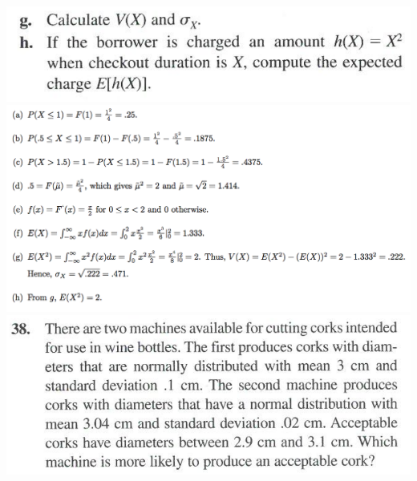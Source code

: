 \documentclass[9pt]{extarticle}
\begin{document}
	 \includegraphics[scale=0.25]{11_2.png}
	\includegraphics[scale=0.37]{11a.png} \includegraphics[scale=0.25]{31.png}
	
\end{document}

